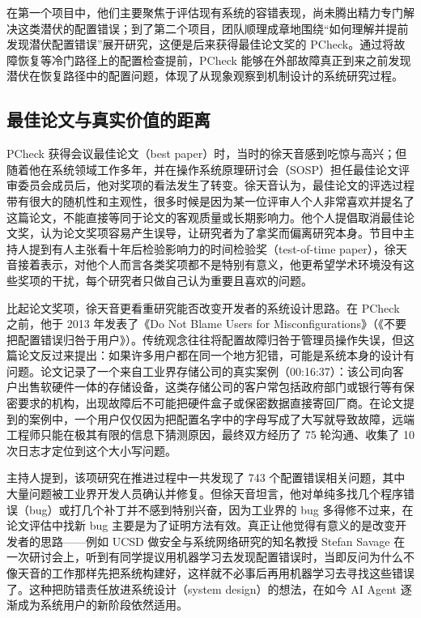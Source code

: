 \documentclass[UTF8,a4paper,11pt,fontset=fandol]{ctexart}
\begin{document}
在第一个项目中，他们主要聚焦于评估现有系统的容错表现，尚未腾出精力专门解决这类潜伏的配置错误；到了第二个项目，团队顺理成章地围绕“如何理解并提前发现潜伏配置错误”展开研究，这便是后来获得最佳论文奖的 PCheck。通过将故障恢复等冷门路径上的配置检查提前，PCheck 能够在外部故障真正到来之前发现潜伏在恢复路径中的配置问题，体现了从现象观察到机制设计的系统研究过程。

\subsection{最佳论文与真实价值的距离}
PCheck 获得会议最佳论文（best paper）时，当时的徐天音感到吃惊与高兴；但随着他在系统领域工作多年，并在操作系统原理研讨会（SOSP）担任最佳论文评审委员会成员后，他对奖项的看法发生了转变。徐天音认为，最佳论文的评选过程带有很大的随机性和主观性，很多时候是因为某一位评审人个人非常喜欢并提名了这篇论文，不能直接等同于论文的客观质量或长期影响力。他个人提倡取消最佳论文奖，认为论文奖项容易产生误导，让研究者为了拿奖而偏离研究本身。节目中主持人提到有人主张看十年后检验影响力的时间检验奖（test-of-time paper），徐天音接着表示，对他个人而言各类奖项都不是特别有意义，他更希望学术环境没有这些奖项的干扰，每个研究者只做自己认为重要且喜欢的问题。

比起论文奖项，徐天音更看重研究能否改变开发者的系统设计思路。在 PCheck 之前，他于 2013 年发表了《Do Not Blame Users for Misconfigurations》（《不要把配置错误归咎于用户》）。传统观念往往将配置故障归咎于管理员操作失误，但这篇论文反过来提出：如果许多用户都在同一个地方犯错，可能是系统本身的设计有问题。论文记录了一个来自工业界存储公司的真实案例（00:16:37）：该公司向客户出售软硬件一体的存储设备，这类存储公司的客户常包括政府部门或银行等有保密要求的机构，出现故障后不可能把硬件盒子或保密数据直接寄回厂商。在论文提到的案例中，一个用户仅仅因为把配置名字中的字母写成了大写就导致故障，远端工程师只能在极其有限的信息下猜测原因，最终双方经历了 75 轮沟通、收集了 10 次日志才定位到这个大小写问题。

主持人提到，该项研究在推进过程中一共发现了 743 个配置错误相关问题，其中大量问题被工业界开发人员确认并修复。但徐天音坦言，他对单纯多找几个程序错误（bug）或打几个补丁并不感到特别兴奋，因为工业界的 bug 多得修不过来，在论文评估中找新 bug 主要是为了证明方法有效。真正让他觉得有意义的是改变开发者的思路——例如 UCSD 做安全与系统网络研究的知名教授 Stefan Savage 在一次研讨会上，听到有同学提议用机器学习去发现配置错误时，当即反问为什么不像天音的工作那样先把系统构建好，这样就不必事后再用机器学习去寻找这些错误了。这种把防错责任放进系统设计（system design）的想法，在如今 AI Agent 逐渐成为系统用户的新阶段依然适用。
\end{document}
